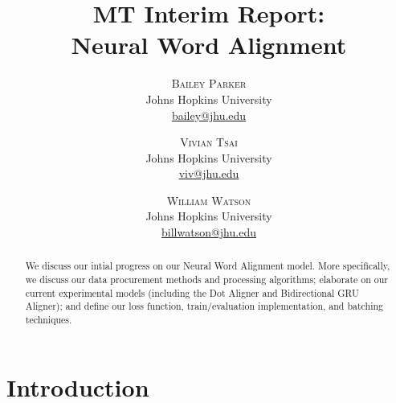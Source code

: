 \documentclass[twoside,twocolumn]{article}
\title{MT Interim Report: \\ Neural Word Alignment}
\author{%
\textsc{Bailey Parker} \\[1ex]
\normalsize Johns Hopkins University \\
\normalsize \href{mailto:bailey@jhu.edu}{bailey@jhu.edu}
 \and
 \textsc{Vivian Tsai} \\[1ex]
\normalsize Johns Hopkins University \\
\normalsize \href{mailto:viv@jhu.edu}{viv@jhu.edu}
 \and
  \textsc{William Watson} \\[1ex]
\normalsize Johns Hopkins University \\
\normalsize \href{mailto:billwatson@jhu.edu}{billwatson@jhu.edu}
}
\date{}
\begin{document}
\maketitle




\begin{abstract}
We discuss our intial progress on our Neural Word Alignment model.
More specifically, we discuss our data procurement methods and processing
algorithms; elaborate on our current experimental models (including the Dot Aligner and Bidirectional GRU Aligner); and define our loss function,
train/evaluation implementation, and batching techniques.
\end{abstract}

\section{Introduction}

\end{document}
